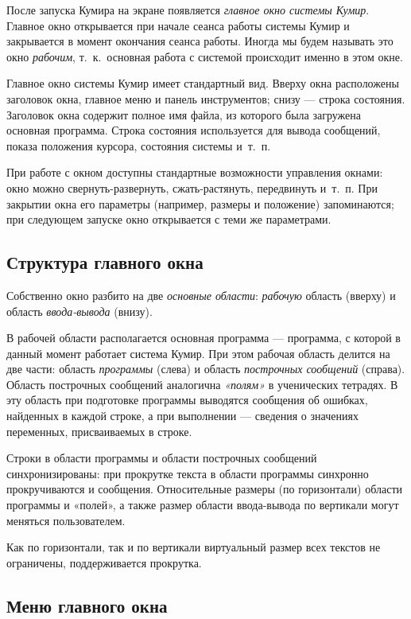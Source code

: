 \documentclass[12pt,a4paper]{article}
\begin{document}
После запуска Кумира на экране появляется \emph{главное окно системы Кумир}. Главное окно открывается при начале сеанса работы системы Кумир и закрывается в момент окончания сеанса работы. Иногда мы будем называть это окно \emph{рабочим}, т.~к.~основная работа с системой происходит именно в этом окне.

Главное окно системы Кумир имеет стандартный вид. Вверху окна расположены заголовок окна, главное меню и  панель инструментов; снизу --- строка состояния. Заголовок окна содержит полное имя файла, из которого была загружена основная программа. Строка состояния используется для вывода сообщений, показа положения курсора, состояния системы и~т.~п.

При работе с окном доступны стандартные возможности управления окнами: окно можно свернуть-развернуть, сжать-растянуть, передвинуть и~т.~п. При закрытии окна его параметры (например, размеры и положение) запоминаются; при следующем запуске окно открывается с теми же параметрами.

\subsection{Структура главного окна}

Собственно окно разбито на две \emph{основные области}: \emph{рабочую} область (вверху) и область \emph{ввода-вывода} (внизу).

В рабочей области располагается основная программа --- программа, с которой в данный момент работает система Кумир. При этом рабочая область делится на две части: область \emph{программы} (слева) и область \emph{построчных сообщений}  (справа). Область построчных сообщений  аналогична \emph{«полям»} в ученических тетрадях. В эту область при подготовке программы выводятся сообщения об ошибках,  найденных в каждой строке, а при выполнении --- сведения о значениях переменных, присваиваемых в  строке.

Строки в области программы  и области построчных сообщений синхронизированы: при прокрутке текста в области программы синхронно прокручиваются и сообщения. Относительные размеры (по горизонтали) области программы и «полей», а также размер области ввода-вывода по вертикали могут меняться пользователем. 

Как по горизонтали, так и по вертикали виртуальный размер всех текстов не ограничены, поддерживается прокрутка.

\subsection{Меню главного окна}
\end{document}
